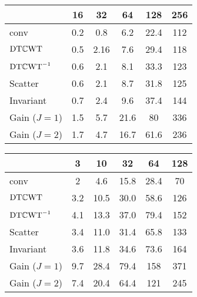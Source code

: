 \begin{table}[bt]
  \renewcommand{\arraystretch}{1.2}
  \centering
  \begin{tabular}{@{}l ccccc@{}}
    \toprule
    & 16 & 32 & 64 & 128 & 256 \\
    \midrule
    conv & 0.2 & 0.8 & 6.2 & 22.4 & 112 \\
    $\mathrm{DT}\mathbb{C}\mathrm{WT}$ & 0.5 & 2.16 & 7.6 & 29.4 & 118 \\
    $\mathrm{DT}\mathbb{C}\mathrm{WT}^{-1}$ & 0.6 & 2.1 & 8.1 & 33.3 & 123\\
    Scatter & 0.6 & 2.1 & 8.7 & 31.8 & 125 \\
    Invariant & 0.7 & 2.4 & 9.6 & 37.4 & 144 \\
    Gain ($J=1$) & 1.5 & 5.7 & 21.6 & 80 &  336 \\
    Gain ($J=2$) & 1.7 & 4.7 & 16.7 & 61.6 & 236 \\
    \bottomrule
  \end{tabular}
\end{table}
\begin{table}[t]
  \renewcommand{\arraystretch}{1.2}
  \centering
  \begin{tabular}{@{}l ccccc@{}}
    \toprule
    & 3 & 10 & 32 & 64 & 128 \\
    \midrule
    conv & 2 & 4.6 & 15.8 & 28.4 & 70 \\
    $\mathrm{DT}\mathbb{C}\mathrm{WT}$ & 3.2 & 10.5 & 30.0 & 58.6 & 126 \\
    $\mathrm{DT}\mathbb{C}\mathrm{WT}^{-1}$ & 4.1 & 13.3 & 37.0 & 79.4 & 152 \\
    Scatter & 3.4 & 11.0 & 31.4 & 65.8 & 133 \\
    Invariant & 3.6 & 11.8 & 34.6 & 73.6 & 164 \\
    Gain ($J=1$) & 9.7 & 28.4 & 79.4 & 158 & 371 \\
    Gain ($J=2$) & 7.4 & 20.4 & 64.4 & 121 & 245 \\
    \bottomrule
  \end{tabular}
\end{table}
